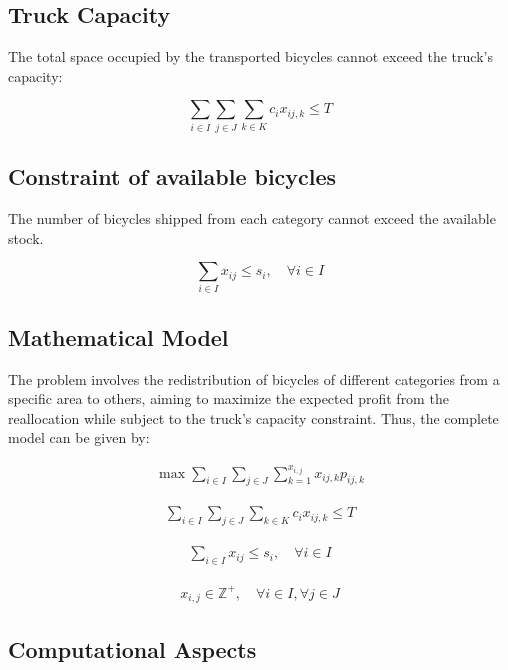 \documentclass[]{article}
\begin{document}
\subsection{Truck Capacity}

The total space occupied by the transported bicycles cannot exceed the truck's capacity:

\begin{equation}
\sum_{i \in I} \sum_{j \in J} \sum_{k \in K} c_i x_{ij,k} \leq T
\end{equation}

\subsection{Constraint of available bicycles}

The number of bicycles shipped from each category cannot exceed the available stock.

\begin{equation}
\sum_{i \in I} x_{ij} \leq s_i, \quad \forall i \in I
\end{equation}

\subsection{Mathematical Model}

The problem involves the redistribution of bicycles of different categories from a specific area to others, aiming to maximize the expected profit from the reallocation while subject to the truck's capacity constraint. Thus, the complete model can be given by:

	
\begin{align}
\max \sum_{i \in I} \sum_{j \in J} \sum_{k=1}^{x_{i,j}} x_{ij,k}p_{ij,k}
\end{align}

\begin{align}
\sum_{i \in I} \sum_{j \in J} \sum_{k \in K} c_i x_{ij,k} \leq T
\end{align}

\begin{align}
\sum_{i \in I} x_{ij} \leq s_i, \quad \forall i \in I
\end{align}

\begin{align}
		x_{i,j} \in \mathbb{Z}^+,  \quad \forall i \in I, \forall j \in J
\end{align}
	


\subsection{Computational Aspects}
\end{document}
